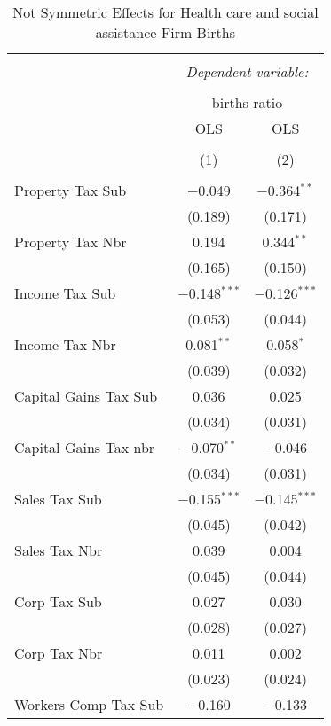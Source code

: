 
\begin{table}[!htbp] \centering 
  \caption{Not Symmetric Effects for  Health care and social assistance Firm Births} 
  \label{62noequality} 
\footnotesize 
\begin{tabular}{@{\extracolsep{5pt}}lcc} 
\\[-1.8ex]\hline 
\hline \\[-1.8ex] 
 & \multicolumn{2}{c}{\textit{Dependent variable:}} \\ 
\cline{2-3} 
\\[-1.8ex] & \multicolumn{2}{c}{births ratio} \\ 
 & OLS & OLS \\ 
\\[-1.8ex] & (1) & (2)\\ 
\hline \\[-1.8ex] 
 Property Tax Sub & $-$0.049 & $-$0.364$^{**}$ \\ 
  & (0.189) & (0.171) \\ 
  Property Tax Nbr & 0.194 & 0.344$^{**}$ \\ 
  & (0.165) & (0.150) \\ 
  Income Tax Sub & $-$0.148$^{***}$ & $-$0.126$^{***}$ \\ 
  & (0.053) & (0.044) \\ 
  Income Tax Nbr & 0.081$^{**}$ & 0.058$^{*}$ \\ 
  & (0.039) & (0.032) \\ 
  Capital Gains Tax Sub & 0.036 & 0.025 \\ 
  & (0.034) & (0.031) \\ 
  Capital Gains Tax nbr & $-$0.070$^{**}$ & $-$0.046 \\ 
  & (0.034) & (0.031) \\ 
  Sales Tax Sub & $-$0.155$^{***}$ & $-$0.145$^{***}$ \\ 
  & (0.045) & (0.042) \\ 
  Sales Tax Nbr & 0.039 & 0.004 \\ 
  & (0.045) & (0.044) \\ 
  Corp Tax Sub & 0.027 & 0.030 \\ 
  & (0.028) & (0.027) \\ 
  Corp Tax Nbr & 0.011 & 0.002 \\ 
  & (0.023) & (0.024) \\ 
  Workers Comp Tax Sub & $-$0.160 & $-$0.133 \\ 

\end{tabular}
\end{table}
